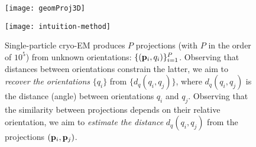 \begin{figure}
    \begin{minipage}[t]{0.48\linewidth}
        \centering
        \texttt{[image: geomProj3D]}
        \caption{%
            Geometry of the imaging model defined in .
            The 3D density $\x$ in the coordinate system $(x_1, x_2, x_3)$ is imaged along the \textit{orientation} $\bth$ to produce the 2D \textit{projection} $\p$ in the coordinate system $(y_1, y_2)$ of the microscope's detector plane.
            The orientation $\bth = (\theta_3, \theta_2, \theta_1)$ is decomposed as the direction $(\theta_2, \theta_1) \in [0,\pi] \times [0,2\pi[$ (parameterizing the sphere $\mathbb{S}^2$) and the in-plane rotation $\theta_3 \in [0,2\pi[$ (parameterizing the circle $\mathbb{S}^1$).
            In our work, we represent the orientation $\bth$ as a unit quaternion $q$.
        }\label{fig:imaging-geometry}
    \end{minipage}
    \hfill
    \begin{minipage}[t]{0.48\linewidth}
        \centering
        \texttt{[image: intuition-method]}
        \caption{%
            Single-particle cryo-EM produces $P$ projections (with $P$ in the order of $10^5$) from unknown orientations: $\{(\mathbf{p}_i, q_i)\}_{i=1}^P$.
            Observing that distances between orientations constrain the latter, we aim to \textit{recover the orientations} $\{q_i\}$ from $\{d_q(q_i, q_j)\}$, where $d_q(q_i, q_j)$ is the distance (angle) between orientations $q_i$ and $q_j$.
            Observing that the similarity between projections depends on their relative orientation, we aim to \textit{estimate the distance} $d_q(q_i, q_j)$ from the projections $(\mathbf{p}_i, \mathbf{p}_j)$.
        }\label{fig:intuition-method}
    \end{minipage}
\end{figure}

